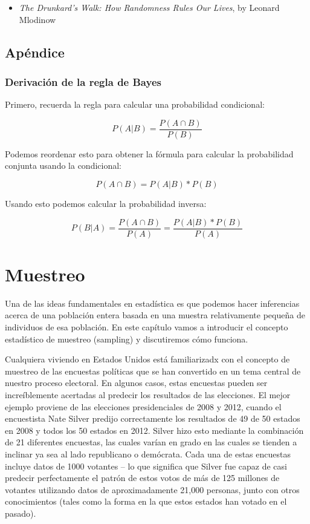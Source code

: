 \documentclass[
  12pt,
]{book}
\providecommand{\tightlist}{%
  \setlength{\itemsep}{0pt}\setlength{\parskip}{0pt}}
\begin{document}
\begin{itemize}
\tightlist
\item
  \emph{The Drunkard's Walk: How Randomness Rules Our Lives}, by Leonard Mlodinow
\end{itemize}

\hypertarget{apuxe9ndice}{%
\section{Apéndice}\label{apuxe9ndice}}

\hypertarget{derivaciuxf3n-de-la-regla-de-bayes}{%
\subsection{Derivación de la regla de Bayes}\label{derivaciuxf3n-de-la-regla-de-bayes}}

Primero, recuerda la regla para calcular una probabilidad condicional:

\[
P(A|B) = \frac{P(A \cap B)}{P(B)}
\]

Podemos reordenar esto para obtener la fórmula para calcular la probabilidad conjunta usando la condicional:

\[
P(A \cap B) = P(A|B) * P(B)
\]

Usando esto podemos calcular la probabilidad inversa:

\[
P(B|A) = \frac{P(A \cap B)}{P(A)} =   \frac{P(A|B)*P(B)}{P(A)}
\]

\hypertarget{sampling}{%
\chapter{Muestreo}\label{sampling}}

Una de las ideas fundamentales en estadística es que podemos hacer inferencias acerca de una población entera basada en una muestra relativamente pequeña de individuos de esa población. En este capítulo vamos a introducir el concepto estadístico de muestreo (sampling) y discutiremos cómo funciona.

Cualquiera viviendo en Estados Unidos está familiarizadx con el concepto de muestreo de las encuestas políticas que se han convertido en un tema central de nuestro proceso electoral. En algunos casos, estas encuestas pueden ser increíblemente acertadas al predecir los resultados de las elecciones. El mejor ejemplo proviene de las elecciones presidenciales de 2008 y 2012, cuando el encuestista Nate Silver predijo correctamente los resultados de 49 de 50 estados en 2008 y todos los 50 estados en 2012. Silver hizo esto mediante la combinación de 21 diferentes encuestas, las cuales varían en grado en las cuales se tienden a inclinar ya sea al lado republicano o demócrata. Cada una de estas encuestas incluye datos de 1000 votantes -- lo que significa que Silver fue capaz de casi predecir perfectamente el patrón de estos votos de más de 125 millones de votantes utilizando datos de aproximadamente 21,000 personas, junto con otros conocimientos (tales como la forma en la que estos estados han votado en el pasado).
\end{document}
